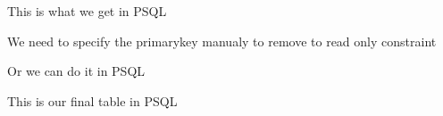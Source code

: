 This is what we get in PSQL
\begin{figure}[H]
\centering
{}
\end{figure}

We need to specify the primarykey manualy to remove to read only constraint
\begin{figure}[H]
\centering
{}
\end{figure}

Or we can do it in PSQL
\begin{figure}[H]
\centering
{}
\end{figure}

This is our final table in PSQL
\begin{figure}[H]
\centering
{}
\end{figure}

